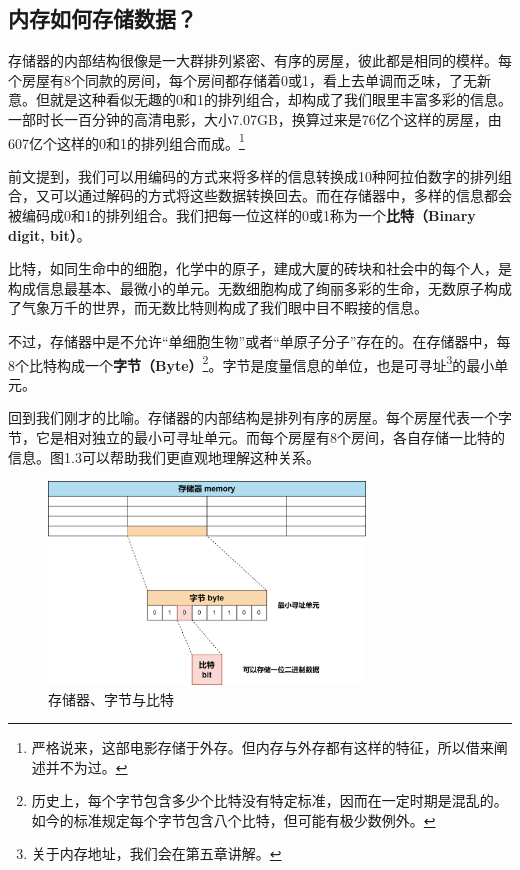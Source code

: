 \subsection*{内存如何存储数据？}
存储器的内部结构很像是一大群排列紧密、有序的房屋，彼此都是相同的模样。每个房屋有8个同款的房间，每个房间都存储着0或1，看上去单调而乏味，了无新意。但就是这种看似无趣的0和1的排列组合，却构成了我们眼里丰富多彩的信息。一部时长一百分钟的高清电影，大小7.07GB，换算过来是76亿个这样的房屋，由607亿个这样的0和1的排列组合而成。\footnote{严格说来，这部电影存储于外存。但内存与外存都有这样的特征，所以借来阐述并不为过。}\par
前文提到，我们可以用编码的方式来将多样的信息转换成10种阿拉伯数字的排列组合，又可以通过解码的方式将这些数据转换回去。而在存储器中，多样的信息都会被编码成0和1的排列组合。我们把每一位这样的0或1称为一个\textbf{比特（Binary digit, bit）}。\par
比特，如同生命中的细胞，化学中的原子，建成大厦的砖块和社会中的每个人，是构成信息最基本、最微小的单元。无数细胞构成了绚丽多彩的生命，无数原子构成了气象万千的世界，而无数比特则构成了我们眼中目不睱接的信息。\par
不过，存储器中是不允许``单细胞生物''或者``单原子分子''存在的。在存储器中，每8个比特构成一个\textbf{字节（Byte）}\footnote{历史上，每个字节包含多少个比特没有特定标准，因而在一定时期是混乱的。如今的标准规定每个字节包含八个比特，但可能有极少数例外。}。字节是度量信息的单位，也是可寻址\footnote{关于内存地址，我们会在第五章讲解。}的最小单元。\par
回到我们刚才的比喻。存储器的内部结构是排列有序的房屋。每个房屋代表一个字节，它是相对独立的最小可寻址单元。而每个房屋有8个房间，各自存储一比特的信息。图1.3可以帮助我们更直观地理解这种关系。\par
\begin{figure}[htbp]
    \centering
    \includegraphics[width=0.75\textwidth]{../images/generalized_parts/01_Memory_byte_and_bit.drawio.png}
    \caption{存储器、字节与比特}
\end{figure}
